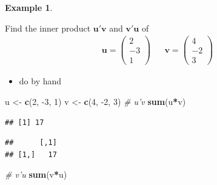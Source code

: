 \documentclass[
]{book}
\newenvironment{Shaded}{\begin{snugshade}}{\end{snugshade}}
\newcommand{\CommentTok}[1]{\textcolor[rgb]{0.56,0.35,0.01}{\textit{#1}}}
\newcommand{\DecValTok}[1]{\textcolor[rgb]{0.00,0.00,0.81}{#1}}
\newcommand{\KeywordTok}[1]{\textcolor[rgb]{0.13,0.29,0.53}{\textbf{#1}}}
\newcommand{\NormalTok}[1]{#1}
\newcommand{\OperatorTok}[1]{\textcolor[rgb]{0.81,0.36,0.00}{\textbf{#1}}}
\newcommand{\StringTok}[1]{\textcolor[rgb]{0.31,0.60,0.02}{#1}}
\providecommand{\tightlist}{%
  \setlength{\itemsep}{0pt}\setlength{\parskip}{0pt}}
\theoremstyle{definition}
\theoremstyle{definition}
\newtheorem{example}{Example}[chapter]
\theoremstyle{definition}
\theoremstyle{remark}
\begin{document}
\begin{example}
\protect\hypertarget{exm:unlabeled-div-185}{}\label{exm:unlabeled-div-185}

Find the inner product \(\mathbf{u}'\mathbf{v}\) and \(\mathbf{v}'\mathbf{u}\) of
\[
\begin{aligned}
\mathbf{u} = \begin{pmatrix} 2 \\ -3 \\ 1 \end{pmatrix} & & \mathbf{v} = \begin{pmatrix} 4 \\ -2 \\ 3 \end{pmatrix} 
\end{aligned}
\]

\begin{itemize}
\tightlist
\item
  do by hand
\end{itemize}

\begin{Shaded}
\begin{Highlighting}[]
\NormalTok{u <-}\StringTok{ }\KeywordTok{c}\NormalTok{(}\DecValTok{2}\NormalTok{, }\DecValTok{-3}\NormalTok{, }\DecValTok{1}\NormalTok{)}
\NormalTok{v <-}\StringTok{ }\KeywordTok{c}\NormalTok{(}\DecValTok{4}\NormalTok{, }\DecValTok{-2}\NormalTok{, }\DecValTok{3}\NormalTok{)}
\CommentTok{# u'v}
\KeywordTok{sum}\NormalTok{(u}\OperatorTok{*}\NormalTok{v)}
\end{Highlighting}
\end{Shaded}

\begin{verbatim}
## [1] 17
\end{verbatim}

\begin{Shaded}
\end{Shaded}

\begin{verbatim}
##      [,1]
## [1,]   17
\end{verbatim}

\begin{Shaded}
\begin{Highlighting}[]
\CommentTok{# v'u}
\KeywordTok{sum}\NormalTok{(v}\OperatorTok{*}\NormalTok{u)}
\end{Highlighting}
\end{Shaded}


\end{example}
\end{document}
